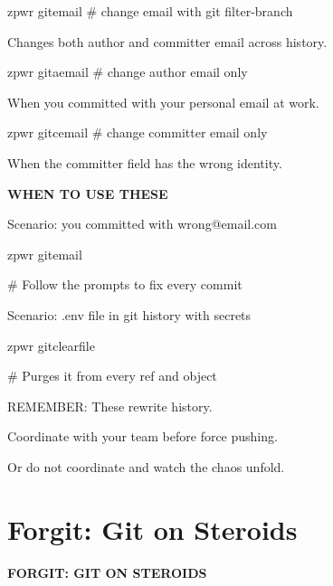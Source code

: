 \documentclass[11pt,a4paper,twoside]{book}
\begin{document}
\begin{codebox}
zpwr gitemail          \# change email with git filter-branch\\
\end{codebox}

Changes both author and committer email across history.

\begin{codebox}
zpwr gitaemail         \# change author email only\\
\end{codebox}

When you committed with your personal email at work.

\begin{codebox}
zpwr gitcemail         \# change committer email only\\
\end{codebox}

When the committer field has the wrong identity.


\vspace{12pt}
{\bfseries\color{neonyellow} WHEN TO USE THESE}\vspace{4pt}

Scenario: you committed with wrong@email.com

\begin{codebox}
zpwr gitemail\\
\end{codebox}

\# Follow the prompts to fix every commit

Scenario: .env file in git history with secrets

\begin{codebox}
zpwr gitclearfile\\
\end{codebox}

\# Purges it from every ref and object

REMEMBER: These rewrite history.

Coordinate with your team before force pushing.

Or do not coordinate and watch the chaos unfold.


\vspace{16pt}

\section{Forgit: Git on Steroids}


\vspace{10pt}
{\large\bfseries\color{neoncyan} FORGIT: GIT ON STEROIDS}\vspace{6pt}
\end{document}
